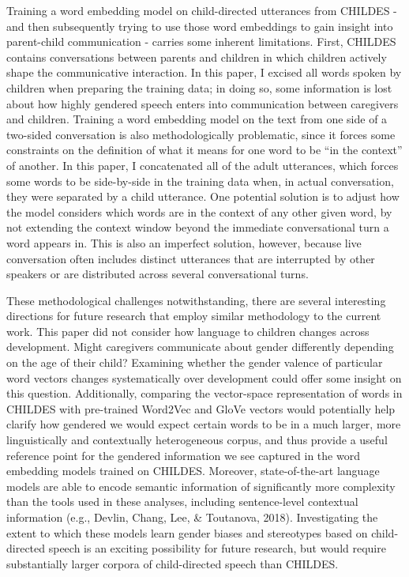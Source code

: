 \documentclass[10pt, letterpaper]{article}
\begin{document}
Training a word embedding model on child-directed utterances from
CHILDES - and then subsequently trying to use those word embeddings to
gain insight into parent-child communication - carries some inherent
limitations. First, CHILDES contains conversations between parents and
children in which children actively shape the communicative interaction.
In this paper, I excised all words spoken by children when preparing the
training data; in doing so, some information is lost about how highly
gendered speech enters into communication between caregivers and
children. Training a word embedding model on the text from one side of a
two-sided conversation is also methodologically problematic, since it
forces some constraints on the definition of what it means for one word
to be ``in the context'' of another. In this paper, I concatenated all
of the adult utterances, which forces some words to be side-by-side in
the training data when, in actual conversation, they were separated by a
child utterance. One potential solution is to adjust how the model
considers which words are in the context of any other given word, by not
extending the context window beyond the immediate conversational turn a
word appears in. This is also an imperfect solution, however, because
live conversation often includes distinct utterances that are
interrupted by other speakers or are distributed across several
conversational turns.

These methodological challenges notwithstanding, there are several
interesting directions for future research that employ similar
methodology to the current work. This paper did not consider how
language to children changes across development. Might caregivers
communicate about gender differently depending on the age of their
child? Examining whether the gender valence of particular word vectors
changes systematically over development could offer some insight on this
question. Additionally, comparing the vector-space representation of
words in CHILDES with pre-trained Word2Vec and GloVe vectors would
potentially help clarify how gendered we would expect certain words to
be in a much larger, more linguistically and contextually heterogeneous
corpus, and thus provide a useful reference point for the gendered
information we see captured in the word embedding models trained on
CHILDES. Moreover, state-of-the-art language models are able to encode
semantic information of significantly more complexity than the tools
used in these analyses, including sentence-level contextual information
(e.g., Devlin, Chang, Lee, \& Toutanova, 2018). Investigating the extent
to which these models learn gender biases and stereotypes based on
child-directed speech is an exciting possibility for future research,
but would require substantially larger corpora of child-directed speech
than CHILDES.
\end{document}
